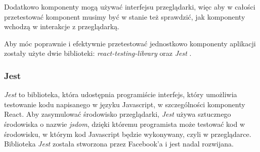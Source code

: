 Dodatkowo komponenty mogą używać interfejsu przeglądarki, więc aby w całości przetestować komponent musimy być w stanie też sprawdzić, jak komponenty wchodzą w interakcje z przeglądarką.

Aby móc poprawnie i efektywnie przetestować jednostkowo komponenty aplikacji zostały użyte dwie biblioteki: \emph{react-testing-library} \cite{ref_rtl_doc} oraz \emph{Jest} \cite{ref_jest_doc}.

\subsubsection{Jest} \emph{Jest} to biblioteka, która udostępnia programiście interfejs, który umożliwia testowanie kodu napisanego w języku Javascript, w szczególności komponenty React. Aby zasymulować środowisko przeglądarki,
\emph{Jest} używa sztucznego środowiska o nazwie \emph{jsdom}, dzięki któremu programista może testować kod w środowisku, w którym kod Javascript będzie wykonywany, czyli w przeglądarce. Biblioteka \emph{Jest} została stworzona przez Facebook'a i jest nadal rozwijana.

